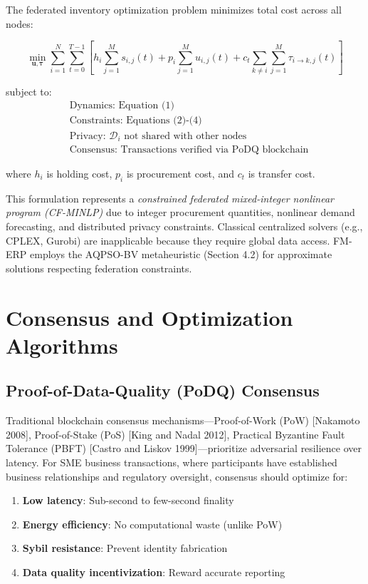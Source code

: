 \documentclass[times,10pt,twocolumn]{jucs2e}
\begin{document}
The federated inventory optimization problem minimizes total cost across all nodes:

\begin{equation}
\min_{\mathbf{u}, \boldsymbol{\tau}} \sum_{i=1}^N \sum_{t=0}^{T-1} \left[ h_i \sum_{j=1}^M s_{i,j}(t) + p_i \sum_{j=1}^M u_{i,j}(t) + c_t \sum_{k \neq i} \sum_{j=1}^M \tau_{i \to k,j}(t) \right]
\end{equation}

subject to:
\begin{align}
&\text{Dynamics: Equation (1)} \\
&\text{Constraints: Equations (2)-(4)} \\
&\text{Privacy: } \mathcal{D}_i \text{ not shared with other nodes} \\
&\text{Consensus: Transactions verified via PoDQ blockchain}
\end{align}

where $h_i$ is holding cost, $p_i$ is procurement cost, and $c_t$ is transfer cost.

This formulation represents a \textit{constrained federated mixed-integer nonlinear program (CF-MINLP)} due to integer procurement quantities, nonlinear demand forecasting, and distributed privacy constraints. Classical centralized solvers (e.g., CPLEX, Gurobi) are inapplicable because they require global data access. FM-ERP employs the AQPSO-BV metaheuristic (Section 4.2) for approximate solutions respecting federation constraints.


\section{Consensus and Optimization Algorithms}

\subsection{Proof-of-Data-Quality (PoDQ) Consensus}

Traditional blockchain consensus mechanisms—Proof-of-Work (PoW) [Nakamoto 2008], Proof-of-Stake (PoS) [King and Nadal 2012], Practical Byzantine Fault Tolerance (PBFT) [Castro and Liskov 1999]—prioritize adversarial resilience over latency. For SME business transactions, where participants have established business relationships and regulatory oversight, consensus should optimize for:
\begin{enumerate}
\item \textbf{Low latency}: Sub-second to few-second finality
\item \textbf{Energy efficiency}: No computational waste (unlike PoW)
\item \textbf{Sybil resistance}: Prevent identity fabrication
\item \textbf{Data quality incentivization}: Reward accurate reporting
\end{enumerate}
\end{document}
